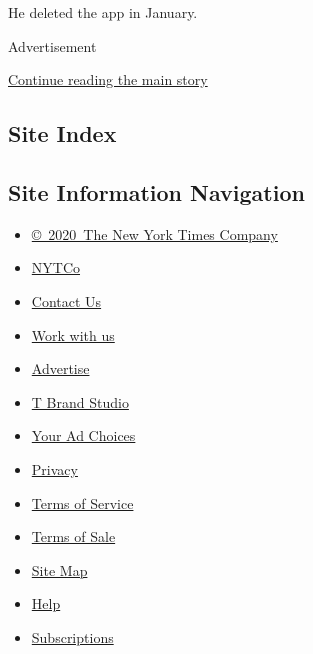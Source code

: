 He deleted the app in January.

Advertisement

\protect\hyperlink{after-bottom}{Continue reading the main story}

\hypertarget{site-index}{%
\subsection{Site Index}\label{site-index}}

\hypertarget{site-information-navigation}{%
\subsection{Site Information
Navigation}\label{site-information-navigation}}

\begin{itemize}
\tightlist
\item
  \href{https://help.nytimes3xbfgragh.onion/hc/en-us/articles/115014792127-Copyright-notice}{©~2020~The
  New York Times Company}
\end{itemize}

\begin{itemize}
\tightlist
\item
  \href{https://www.nytco.com/}{NYTCo}
\item
  \href{https://help.nytimes3xbfgragh.onion/hc/en-us/articles/115015385887-Contact-Us}{Contact
  Us}
\item
  \href{https://www.nytco.com/careers/}{Work with us}
\item
  \href{https://nytmediakit.com/}{Advertise}
\item
  \href{http://www.tbrandstudio.com/}{T Brand Studio}
\item
  \href{https://www.nytimes3xbfgragh.onion/privacy/cookie-policy\#how-do-i-manage-trackers}{Your
  Ad Choices}
\item
  \href{https://www.nytimes3xbfgragh.onion/privacy}{Privacy}
\item
  \href{https://help.nytimes3xbfgragh.onion/hc/en-us/articles/115014893428-Terms-of-service}{Terms
  of Service}
\item
  \href{https://help.nytimes3xbfgragh.onion/hc/en-us/articles/115014893968-Terms-of-sale}{Terms
  of Sale}
\item
  \href{https://spiderbites.nytimes3xbfgragh.onion}{Site Map}
\item
  \href{https://help.nytimes3xbfgragh.onion/hc/en-us}{Help}
\item
  \href{https://www.nytimes3xbfgragh.onion/subscription?campaignId=37WXW}{Subscriptions}
\end{itemize}
